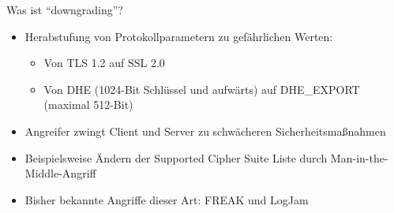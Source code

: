 \documentclass{f4_beamer_metropolis}
\begin{document}


\begin{frame}{Was ist \enquote{downgrading}?}
\begin{itemize}
  \item Herabstufung von Protokollparametern zu gefährlichen Werten:
  \begin{itemize}
    \item Von TLS 1.2 auf SSL 2.0
    \item Von DHE (1024-Bit Schlüssel und aufwärts) auf DHE\_EXPORT (maximal 512-Bit)
  \end{itemize}
  \item Angreifer zwingt Client und Server zu schwächeren Sicherheitsmaßnahmen
  \item Beispielsweise Ändern der Supported Cipher Suite Liste durch Man-in-the-Middle-Angriff
  \item Bisher bekannte Angriffe dieser Art: FREAK und LogJam
\end{itemize}
\end{frame}
\end{document}
